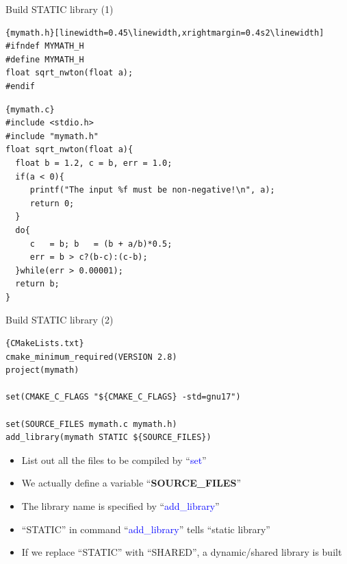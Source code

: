 \begin{frame}[fragile]{Build STATIC library (1)}
\vspace{-0.15in}
\begin{lstlisting}{mymath.h}[linewidth=0.45\linewidth,xrightmargin=0.4s2\linewidth]
#ifndef MYMATH_H
#define MYMATH_H
float sqrt_nwton(float a);
#endif
\end{lstlisting}
\vspace{-0.15in}
\begin{lstlisting}{mymath.c}
#include <stdio.h>
#include "mymath.h"
float sqrt_nwton(float a){
  float b = 1.2, c = b, err = 1.0;
  if(a < 0){
     printf("The input %f must be non-negative!\n", a);
     return 0;
  }
  do{
     c   = b; b   = (b + a/b)*0.5;
     err = b > c?(b-c):(c-b);
  }while(err > 0.00001);
  return b;
}
\end{lstlisting}
\end{frame}

\begin{frame}[fragile]{Build STATIC library (2)}
\begin{lstlisting}[linewidth=0.95\linewidth, firstnumber= 1, xleftmargin=0.02\linewidth]{CMakeLists.txt}
cmake_minimum_required(VERSION 2.8)
project(mymath)

set(CMAKE_C_FLAGS "${CMAKE_C_FLAGS} -std=gnu17")

set(SOURCE_FILES mymath.c mymath.h)
add_library(mymath STATIC ${SOURCE_FILES})

\end{lstlisting}

\begin{itemize}
	\item {List out all the files to be compiled by ``\textcolor{blue}{set}''}
	\item {We actually define a variable ``\textbf{SOURCE\_FILES}''}
	\item {The library name is specified by ``\textcolor{blue}{add\_library}''}
	\item {``STATIC'' in command ``\textcolor{blue}{add\_library}'' tells ``static library''}
	\item {If we replace ``STATIC'' with ``SHARED'', a dynamic/shared library is built}
\end{itemize}
\end{frame}

